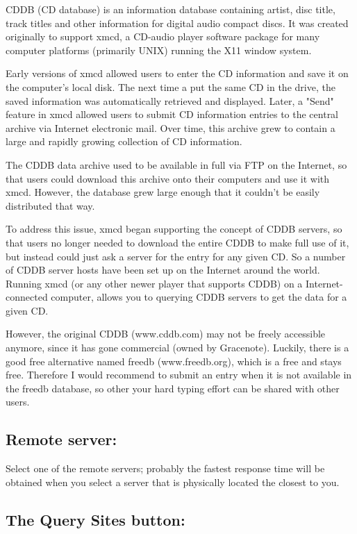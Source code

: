 CDDB (CD database) is an information database containing artist, disc
title, track titles and other information for digital audio compact
discs.  It was created originally to support xmcd, a CD-audio player
software package for many computer platforms (primarily UNIX) running
the X11 window system.

Early versions of xmcd allowed users to enter the CD information and
save it on the computer's local disk.  The next time a put the
same CD in the drive, the saved information was automatically retrieved
and displayed.  Later, a "Send" feature in xmcd allowed
users to submit CD information entries to the central archive via
Internet electronic mail.  Over time, this archive grew to contain
a large and rapidly growing collection of CD information.

The CDDB data archive used to be available in full via FTP on the
Internet, so that users could download this archive onto their computers
and use it with xmcd.  However, the database grew large enough that it
couldn't be easily distributed that way.

To address this issue, xmcd began supporting the concept of CDDB servers,
so that users no longer needed to download the entire CDDB to make full
use of it, but instead could just ask a server for the entry for any given CD.
So a number of CDDB server hosts have been set up on
the Internet around the world. Running xmcd (or any other newer player
that supports CDDB) on a Internet-connected computer, allows you to
querying CDDB servers to get the data for a given CD.

However, the original CDDB (www.cddb.com) may not be freely accessible anymore,
since it has gone commercial (owned by Gracenote). Luckily, there is a good free alternative
named freedb (www.freedb.org), which is a free and stays free. Therefore I would
recommend to submit an entry when it is not available in the freedb database, so 
other your hard typing effort can be shared with other users.


\subsection{Remote server:}

Select one of the remote servers; probably the fastest response time will be
obtained when you select a server that is physically located the closest
to you.

\subsection{The Query Sites button:}

